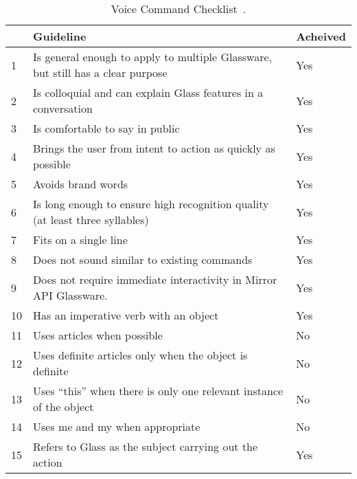 	\begin{table}[ht!]
    		\caption{Voice Command Checklist~\cite{glassVoiceChecklist}.} \label{tab:voiceCommandCheckTableChecked}
		\centering \begin{tabularx}{\textwidth}{l|X|l} \hline
		 & \textbf{Guideline} & \textbf{Acheived} \\ \hline \hline
       
1	&	Is general enough to apply to multiple Glassware, but still has a clear purpose		&	Yes		\\ \hline
2	&	Is colloquial and can explain Glass features in a conversation					&	Yes		\\ \hline
3	&	Is comfortable to say in public											&	Yes		\\ \hline
4	&	Brings the user from intent to action as quickly as possible					&	Yes		\\ \hline
5	&	Avoids brand words													&	Yes		\\ \hline
6	&	Is long enough to ensure high recognition quality (at least three syllables)			&	Yes		\\ \hline
7	&	Fits on a single line													&	Yes		\\ \hline
8	&	Does not sound similar to existing commands								&	Yes		\\ \hline
9	&	Does not require immediate interactivity in Mirror API Glassware.				&	Yes		\\ \hline
10	&	Has an imperative verb with an object									&	Yes		\\ \hline
11	&	Uses articles when possible											&	No		\\ \hline
12	&	Uses definite articles only when the object is definite							&	No		\\ \hline
13	&	Uses ``this'' when there is only one relevant instance of the object				&	No		\\ \hline
14	&	Uses me and my when appropriate										&	No		\\ \hline
15	&	Refers to Glass as the subject carrying out the action						&	Yes		\\ \hline
		
		\end{tabularx}
	\end{table}